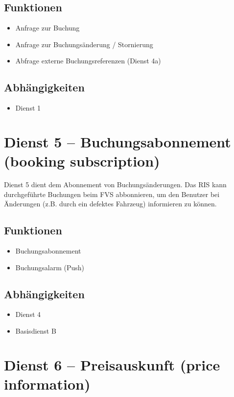 \subsection*{Funktionen}
\begin{itemize}
\item Anfrage zur Buchung
\item Anfrage zur Buchungsänderung / Stornierung
\item Abfrage externe Buchungsreferenzen (Dienst 4a)
\end{itemize}

\subsection*{Abhängigkeiten}
\begin{itemize}
\item Dienst 1
\end{itemize}

\section{Dienst 5 -- Buchungsabonnement (booking subscription)}
\label{sec:Hierachiemodell:Dienst5}
Dienst 5 dient dem Abonnement von Buchungsänderungen. Das RIS kann durchgeführte Buchungen beim FVS abbonnieren, um den Benutzer bei Änderungen (z.B. durch ein defektes Fahrzeug) informieren zu können.

\subsection*{Funktionen}
\begin{itemize}
\item Buchungsabonnement
\item Buchungsalarm (Push)
\end{itemize}

\subsection*{Abhängigkeiten}
\begin{itemize}
\item Dienst 4
\item Basisdienst B
\end{itemize}

\section{Dienst 6 -- Preisauskunft (price information)}
\label{sec:Hierachiemodell:Dienst6}

